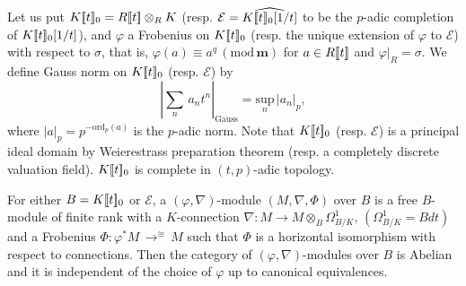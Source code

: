 \documentclass[11pt]{amsart}
\begin{document}
Let us put $K[\hspace*{-0.6mm}[t]\hspace*{-0.6mm}]_0 
= R[\hspace*{-0.6mm}[t]\hspace*{-0.6mm}]\otimes_RK$ 
(resp. $\mathcal E = \widehat{K[\hspace*{-0.6mm}[t]\hspace*{-0.6mm}]_0[1/t]}$ 
to be the $p$-adic completion of $K[\hspace*{-0.6mm}[t]\hspace*{-0.6mm}]_0[1/t]$), 
and $\varphi$ a Frobenius on $K[\hspace*{-0.6mm}[t]\hspace*{-0.6mm}]_0$ 
(resp. the unique extension of $\varphi$ to $\mathcal E$) 
with respect to $\sigma$, that is, 
$\varphi(a) \equiv a^q\, (\mathrm{mod}\, \mathbf m)$ for $a \in R[\hspace*{-0.6mm}[t]\hspace*{-0.6mm}]$ 
and $\varphi|_R = \sigma$. 
We define Gauss norm on $K[\hspace*{-0.6mm}[t]\hspace*{-0.6mm}]_0$ (resp. $\mathcal E$) by 
$$
     \left|\sum_n\, a_nt^n\right|_{\mathrm{Gauss}} = \underset{n}{\mathrm{sup}}\, |a_n|_p, 
$$
where $|a|_p = p^{-\mathrm{ord}_p(a)}$ is the $p$-adic norm. 
Note that $K[\hspace*{-0.6mm}[t]\hspace*{-0.6mm}]_0$ (resp. $\mathcal E$) 
is a principal ideal domain by Weierestrass preparation theorem 
(resp. a completely discrete valuation field). $K[\hspace*{-0.6mm}[t]\hspace*{-0.6mm}]_0$ is complete 
in $(t, p)$-adic topology. 

For either $B = K[\hspace*{-0.6mm}[t]\hspace*{-0.6mm}]_0$ or $\mathcal E$, 
a $(\varphi, \nabla)$-module $(M, \nabla, \Phi)$ over $B$ 
is a free $B$-module 
of finite rank with a $K$-connection $\nabla : M \rightarrow M \otimes_B\Omega_{B/K}^1, \, 
(\Omega_{B/K}^1 = Bdt)$ 
and a Frobenius $\Phi : \varphi^\ast M\, \displaystyle{\mathop{\rightarrow}^{\cong}}\, M$ such that  
$\Phi$ is a horizontal isomorphism with respect to connections. 
Then the category of $(\varphi, \nabla)$-modules over $B$ is Abelian 
and it is independent of the choice of $\varphi$ up to canonical equivalences. 
\end{document}
